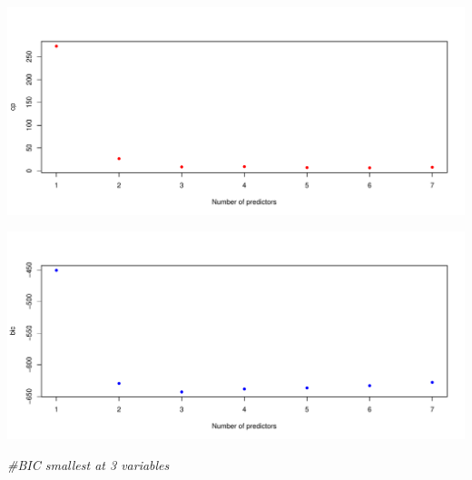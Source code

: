 \documentclass[]{article}
\newenvironment{Shaded}{\begin{snugshade}}{\end{snugshade}}
\newcommand{\KeywordTok}[1]{\textcolor[rgb]{0.13,0.29,0.53}{\textbf{#1}}}
\newcommand{\DataTypeTok}[1]{\textcolor[rgb]{0.13,0.29,0.53}{#1}}
\newcommand{\DecValTok}[1]{\textcolor[rgb]{0.00,0.00,0.81}{#1}}
\newcommand{\StringTok}[1]{\textcolor[rgb]{0.31,0.60,0.02}{#1}}
\newcommand{\CommentTok}[1]{\textcolor[rgb]{0.56,0.35,0.01}{\textit{#1}}}
\newcommand{\OperatorTok}[1]{\textcolor[rgb]{0.81,0.36,0.00}{\textbf{#1}}}
\newcommand{\NormalTok}[1]{#1}
\begin{document}
\includegraphics{hw2_fall18_files/figure-latex/unnamed-chunk-13-1.pdf}

\begin{Shaded}
\end{Shaded}

\includegraphics{hw2_fall18_files/figure-latex/unnamed-chunk-13-2.pdf}

\begin{Shaded}
\begin{Highlighting}[]
\CommentTok{#BIC smallest at 3 variables}
\end{Highlighting}
\end{Shaded}

\begin{Shaded}
\end{Shaded}
\end{document}
